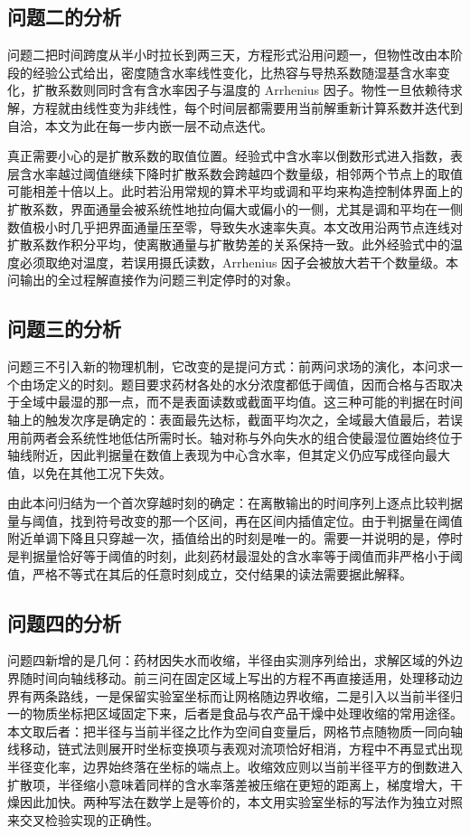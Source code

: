 \subsection{问题二的分析}

问题二把时间跨度从半小时拉长到两三天，方程形式沿用问题一，但物性改由本阶段的经验公式给出，密度随含水率线性变化，比热容与导热系数随湿基含水率变化，扩散系数则同时含有含水率因子与温度的 Arrhenius 因子。物性一旦依赖待求解，方程就由线性变为非线性，每个时间层都需要用当前解重新计算系数并迭代到自洽，本文为此在每一步内嵌一层不动点迭代。

真正需要小心的是扩散系数的取值位置。经验式中含水率以倒数形式进入指数，表层含水率越过阈值继续下降时扩散系数会跨越四个数量级，相邻两个节点上的取值可能相差十倍以上。此时若沿用常规的算术平均或调和平均来构造控制体界面上的扩散系数，界面通量会被系统性地拉向偏大或偏小的一侧，尤其是调和平均在一侧数值极小时几乎把界面通量压至零，导致失水速率失真。本文改用沿两节点连线对扩散系数作积分平均，使离散通量与扩散势差的关系保持一致。此外经验式中的温度必须取绝对温度，若误用摄氏读数，Arrhenius 因子会被放大若干个数量级。本问输出的全过程解直接作为问题三判定停时的对象。

\subsection{问题三的分析}

问题三不引入新的物理机制，它改变的是提问方式：前两问求场的演化，本问求一个由场定义的时刻。题目要求药材各处的水分浓度都低于阈值，因而合格与否取决于全域中最湿的那一点，而不是表面读数或截面平均值。这三种可能的判据在时间轴上的触发次序是确定的：表面最先达标，截面平均次之，全域最大值最后，若误用前两者会系统性地低估所需时长。轴对称与外向失水的组合使最湿位置始终位于轴线附近，因此判据量在数值上表现为中心含水率，但其定义仍应写成径向最大值，以免在其他工况下失效。

由此本问归结为一个首次穿越时刻的确定：在离散输出的时间序列上逐点比较判据量与阈值，找到符号改变的那一个区间，再在区间内插值定位。由于判据量在阈值附近单调下降且只穿越一次，插值给出的时刻是唯一的。需要一并说明的是，停时是判据量恰好等于阈值的时刻，此刻药材最湿处的含水率等于阈值而非严格小于阈值，严格不等式在其后的任意时刻成立，交付结果的读法需要据此解释。

\subsection{问题四的分析}

问题四新增的是几何：药材因失水而收缩，半径由实测序列给出，求解区域的外边界随时间向轴线移动。前三问在固定区域上写出的方程不再直接适用，处理移动边界有两条路线，一是保留实验室坐标而让网格随边界收缩，二是引入以当前半径归一的物质坐标把区域固定下来，后者是食品与农产品干燥中处理收缩的常用途径。本文取后者：把半径与当前半径之比作为空间自变量后，网格节点随物质一同向轴线移动，链式法则展开时坐标变换项与表观对流项恰好相消，方程中不再显式出现半径变化率，边界始终落在坐标的端点上。收缩效应则以当前半径平方的倒数进入扩散项，半径缩小意味着同样的含水率落差被压缩在更短的距离上，梯度增大，干燥因此加快。两种写法在数学上是等价的，本文用实验室坐标的写法作为独立对照来交叉检验实现的正确性。

